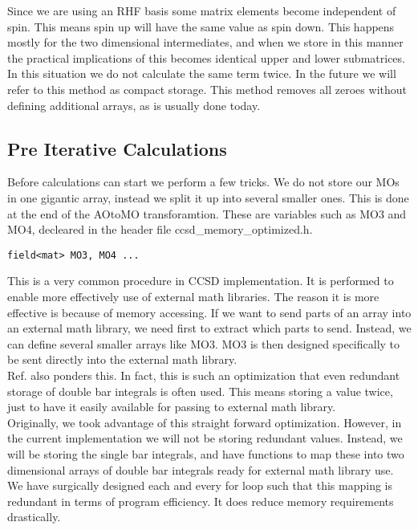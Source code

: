Since we are using an RHF basis some matrix elements become independent of spin. This means spin up will have the same value as spin down. This happens mostly for the two dimensional intermediates, and when we store in this manner the practical implications of this becomes identical upper and lower submatrices. In this situation we do not calculate the same term twice. In the future we will refer to this method as compact storage. This method removes all zeroes without defining additional arrays, as is usually done today. 

\subsection{Pre Iterative Calculations}
Before calculations can start we perform a few tricks. We do not store our MOs in one gigantic array, instead we split it up into several smaller ones. This is done at the end of the AOtoMO transforamtion. These are variables such as MO3 and MO4, decleared in the header file ccsd\_memory\_optimized.h.

\begin{lstlisting}
field<mat> MO3, MO4 ...
\end{lstlisting}
This is a very common procedure in CCSD implementation. It is performed to enable more effectively use of external math libraries. The reason it is more effective is because of memory accessing. If we want to send parts of an array into an external math library, we need first to extract which parts to send. Instead, we can define several smaller arrays like MO3. MO3 is then designed specifically to be sent directly into the external math library. \\

Ref.\cite{ccsd_fac3} also ponders this. In fact, this is such an optimization that even redundant storage of double bar integrals is often used. This means storing a value twice, just to have it easily available for passing to external math library. \\

Originally, we took advantage of this straight forward optimization. However, in the current implementation we will not be storing redundant values. Instead, we will be storing the single bar integrals, and have functions to map these into two dimensional arrays of double bar integrals ready for external math library use. We have surgically designed each and every for loop such that this mapping is redundant in terms of program efficiency. It does reduce memory requirements drastically. \\

